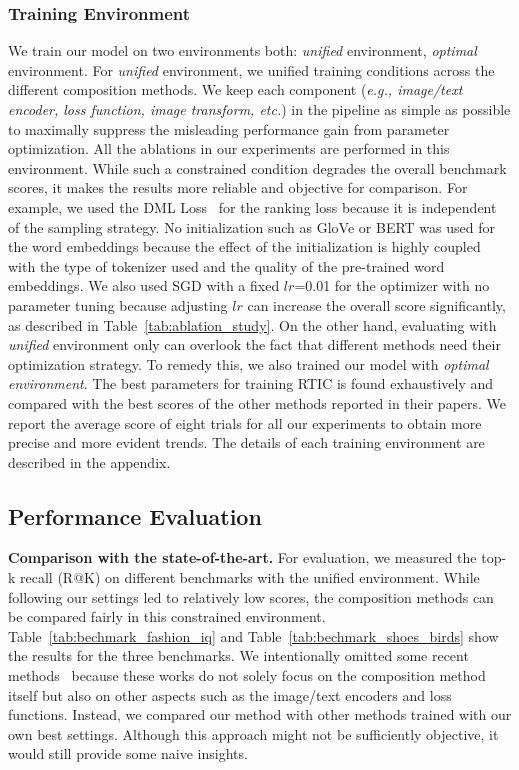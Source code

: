 \documentclass[10pt,twocolumn,letterpaper]{article}
\begin{document}
\subsubsection{Training Environment}
We train our model on two environments both: \textit{unified} environment, \textit{optimal} environment.
For \textit{unified} environment, we unified training conditions across the different composition methods. We keep each component (\textit{e.g., image/text encoder, loss function, image transform, etc.}) in the pipeline as simple as possible to maximally suppress the misleading performance gain from parameter optimization. All the ablations in our experiments are performed in this environment. While such a constrained condition degrades the overall benchmark scores, it makes the results more reliable and objective for comparison. For example, we used the DML Loss~\cite{vo2019composing} for the ranking loss because it is independent of the sampling strategy. No initialization such as GloVe or BERT was used for the word embeddings because the effect of the initialization is highly coupled with the type of tokenizer used and the quality of the pre-trained word embeddings. We also used SGD with a fixed $lr$=0.01 for the optimizer with no parameter tuning because adjusting $lr$ can increase the overall score significantly, as described in Table~\ref{tab:ablation_study}. On the other hand, evaluating with \textit{unified} environment only can overlook the fact that different methods need their optimization strategy. To remedy this, we also trained our model with \textit{optimal environment}. The best parameters for training RTIC is found exhaustively and compared with the best scores of the other methods reported in their papers. We report the average score of eight trials for all our experiments to obtain more precise and more evident trends. The details of each training environment are described in the appendix.


\subsection{Performance Evaluation}

\noindent
\textbf{Comparison with the state-of-the-art.}
For evaluation, we measured the top-k recall (R@K) on different benchmarks with the unified environment. While following our settings led to relatively low scores, the composition methods can be compared fairly in this constrained environment. Table~\ref{tab:bechmark_fashion_iq} and Table~\ref{tab:bechmark_shoes_birds} show the results for the three benchmarks. We intentionally omitted some recent methods~\cite{chen2020learning,jandial2020trace,chen2020image,yu2020curlingnet} because these works do not solely focus on the composition method itself but also on other aspects such as the image/text encoders and loss functions. Instead, we compared our method with other methods trained with our own best settings. Although this approach might not be sufficiently objective, it would still provide some naive insights.
\end{document}

